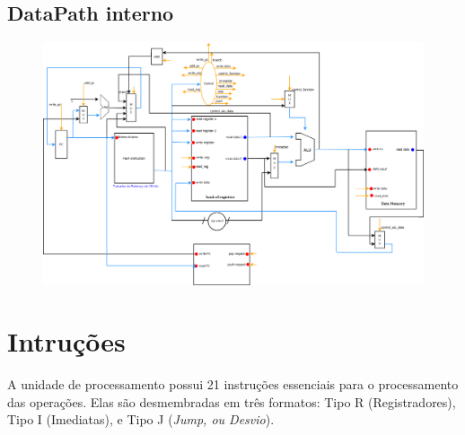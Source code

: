 \documentclass{report}
\begin{document}
  \begin{landscape}
  	\section{DataPath interno}
  	\begin{figure}[H]
  		\centering
  		\includegraphics[width=620px]{./pictures/datapath/DataPath.png}
  	\end{figure}
  \end{landscape}
  
  \section{Intruções}
  A unidade de processamento possui 21 instruções essenciais para o processamento das operações. Elas são desmembradas em três formatos: Tipo R (Registradores), Tipo I (Imediatas), e Tipo J (\textit{Jump, ou Desvio}).
  
\end{document}
